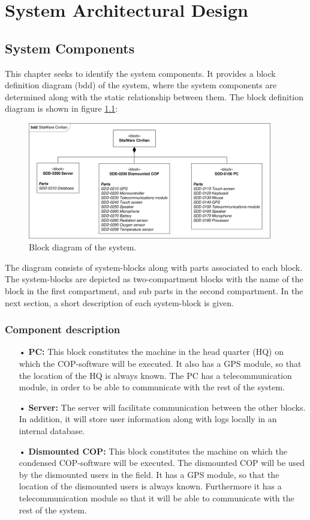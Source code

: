 \chapter{System Architectural Design}
\section{System Components}
This chapter seeks to identify the system components. It provides a block definition diagram (bdd) of the system, where the system components are determined along with the static relationship between them. The block definition diagram is shown in figure \ref{fig:block_diagram}:
\begin{figure}[H]
\centering
\includegraphics[width=0.95\textwidth]
{billeder/bdd_overordnet.pdf}
\caption{Block diagram of the system.}
\label{fig:block_diagram}
\end{figure}
The diagram consists of system-blocks along with parts associated to each block. The system-blocks are depicted as two-compartment blocks with the name of the block in the first compartment, and sub parts in the second compartment. In the next section, a short description of each system-block is given.
\subsection{Component description}
\begin{enumerate}
\item[•] \textbf{PC:} This block constitutes the machine in the head quarter (HQ) on which the COP-software will be executed. It also has a GPS module, so that the location of the HQ is always known. The PC has a telecommunication module, in order to be able to communicate with the rest of the system.
\item[•] \textbf{Server:} The server will facilitate communication between the other blocks. In addition, it will store user information along with logs locally in an internal database.
\item[•] \textbf{Dismounted COP:} This block constitutes the machine on which the condensed COP-software will be executed. The dismounted COP will be used by the dismounted users in the field. It has a GPS module, so that the location of the dismounted users is always known. Furthermore it has a telecommunication module so that it will be able to communicate with the rest of the system. 
\end{enumerate}
